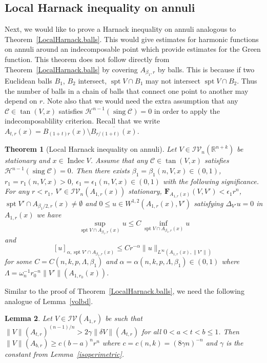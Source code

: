 \documentclass[11pt]{amsart}
\newtheorem{theorem}{Theorem}[section]
\newtheorem{lemma}[theorem]{Lemma}
\theoremstyle{definition}
\newcommand{\HH}{\mathcal{H}}
\newcommand{\R}{\mathbb{R}}
\newcommand{\C}{\mathcal{C}}
\newcommand{\IV}{\mathcal{IV}}
\DeclareMathOperator{\spt}{spt}
\DeclareMathOperator{\sing}{sing}
\DeclareMathOperator{\indec}{Indec}
\begin{document}
\subsection{Local Harnack inequality on annuli}
Next, we would like to prove a Harnack inequality on annuli analogous to Theorem~\ref{LocalHarnack.balls}. This would give estimates for harmonic functions on annuli around an indecomposable point which provide estimates for the Green function. This theorem does not follow directly from Theorem~\ref{LocalHarnack.balls} by covering $A_{\beta_1,r}$ by balls. This is because if two Euclidean balls $B_1$, $B_2$ intersect, $\spt V\cap B_1$ may not intersect $ \spt V\cap B_2$. Thus the number of balls in a chain of balls that connect one point to another may depend on $r$.  Note also that we would need the extra assumption that any $\C\in \tan(V,x)$ satisfies $\HH^{n-1}(\sing\C)=0$ in order to apply the indecomposablility criterion. Recall that we write $A_{t,r}(x)=B_{(1+t)r}(x)\setminus \overline{B_{r/(1+t)}(x)}$.
\begin{theorem}[Local Harnack inequality on annuli]\label{LocalHarnack.annulus}
	Let $V\in \IV_n(\R^{n+k})$ be stationary  and $x\in\indec V$. Assume that any $\C\in \tan(V,x)$ satisfies $\HH^{n-1}(\sing\C)=0$. Then there exists $\beta_1=\beta_1(n,V,x)\in(0,1)$, $r_1=r_1(n,V,x)>0$, $\epsilon_1=\epsilon_1(n,V,x)\in(0,1)$ with the following significance. For any $r<r_1$, $V'\in \IV_n(A_{1,r}(x))$ stationary, $\mathbf{F}_{A_{1,r}(x)}(V,V')<\epsilon_1 r^n$, $\spt V'\cap A_{\beta_1/2, r}(x)\neq\emptyset$ and $0\le u\in W^{1,2}( A_{1,r}(x),V')$ satisfying $\Delta_{V'}u=0$ in $A_{1,r}(x)$ we have
	\[\sup _{\spt V\cap A_{\beta_1,r}(x)}u\le C\inf_{\spt V\cap A_{\beta_1,r}(x)}u\]
    and
    \[[u]_{\alpha,\spt V'\cap A_{\beta_1, r}(x)}\le Cr^{-\alpha}\|u\|_{L^\infty(A_{1,r}(x),\|V'\|)}\]
    for some $C=C(n,k,p,\Lambda,\beta_1)$ and $\alpha=\alpha(n,k,p,\Lambda,\beta_1)\in (0,1)$ where $\Lambda=\omega_n^{-1}r_0^{-n}\|V'\|(A_{1,r_0}(x))$.
\end{theorem}
Similar to the proof of Theorem~\ref{LocalHarnack.balls}, we need the following analogue of Lemma~\ref{volbd}.
\begin{lemma}\label{volbd.annulus}
    Let $V\in \IV(A_{1,r})$ be such that $\|V\|(A_{t,r})^{(n-1)/n}> 2\gamma\|\delta V\|(A_{t,r})$ for all $0<a<t<b\le 1$. Then $\|V\|(A_{b,r})\ge c(b-a)^nr^n$ where $c=c(n,k)=(8\gamma n)^{-n}$ and $\gamma$ is the constant from Lemma~\ref{isoperimetric}.
\end{lemma}
\end{document}
